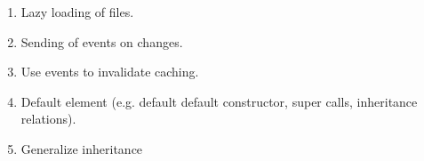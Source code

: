 \message{ !name(todo.tex)}\documentclass{article}
\begin{document}

\begin{enumerate}
\item Lazy loading of files.
\item Sending of events on changes.
\item Use events to invalidate caching.
\item Default element (e.g. default default constructor, super calls,
  inheritance relations).
\item Generalize inheritance
\end{enumerate}


\end{document}

